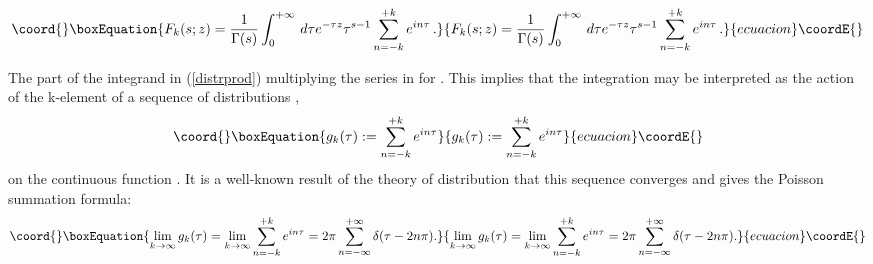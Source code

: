 \documentclass [11pt]{article}
\begin{document}
\begin{equation}\coord{}\boxEquation{
\label{distrprod}
F_k(s;z)=\frac{1}{\Gamma (s)}\int ^{+\infty }_{0}\,d\tau
e^{-\tau z}{\tau}^{s-1}\sum _{n=-k }^{+k }e^{in\tau}\,.
}{
F_k(s;z)=\frac{1}{\Gamma (s)}\int ^{+\infty }_{0}\,d\tau
e^{-\tau z}{\tau}^{s-1}\sum _{n=-k }^{+k }e^{in\tau}\,.
}{ecuacion}\coordE{}\end{equation}

The part of the integrand in (\ref{distrprod}) multiplying the series 
 \coordHE{} in \coordHE{} for  \coordHE{}. This implies that 
the integration may be interpreted as the action of the k-element of a sequence of distributions
\coordHE{},
\begin{equation}\coord{}\boxEquation{
g_k(\tau):=\sum _{n=-k }^{+k }e^{in\tau}
}{
g_k(\tau):=\sum _{n=-k }^{+k }e^{in\tau}
}{ecuacion}\coordE{}\end{equation}
on the continuous function \coordHE{}.
It is a well-known result
 of the theory of distribution that this sequence converges and gives the Poisson summation formula:
\begin{equation}\coord{}\boxEquation{\nonumber
\lim_{k\rightarrow\infty}g_k(\tau) = \lim_{k\rightarrow\infty}\sum _{n=-k }^{+k }e^{in\tau} = 2\pi \sum _{n=-\infty }^{+\infty }\delta
(\tau-2n\pi ).
}{\nonumber
\lim_{k\rightarrow\infty}g_k(\tau) = \lim_{k\rightarrow\infty}\sum _{n=-k }^{+k }e^{in\tau} = 2\pi \sum _{n=-\infty }^{+\infty }\delta
(\tau-2n\pi ).
}{ecuacion}\coordE{}\end{equation}
\end{document}
